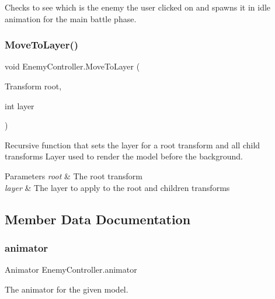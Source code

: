 Checks to see which is the enemy the user clicked on and spawns it in idle animation for the main battle phase. 

\mbox{\label{class_enemy_controller_a461addd95c41f6c754415cc6ef660856}} 
\subsubsection{\texorpdfstring{MoveToLayer()}{MoveToLayer()}}
{\footnotesize\ttfamily void Enemy\+Controller.\+Move\+To\+Layer (\begin{DoxyParamCaption}\item[{Transform}]{root,  }\item[{int}]{layer }\end{DoxyParamCaption})\hspace{0.3cm}{\ttfamily [private]}}



Recursive function that sets the layer for a root transform and all child transforms Layer used to render the model before the background. 


\begin{DoxyParams}{Parameters}
{\em root} & The root transform\\
\hline
{\em layer} & The layer to apply to the root and children transforms\\
\hline
\end{DoxyParams}


\subsection{Member Data Documentation}
\mbox{\label{class_enemy_controller_a8eba5438edc982ca7aa19493d0376412}} 
\subsubsection{\texorpdfstring{animator}{animator}}
{\footnotesize\ttfamily Animator Enemy\+Controller.\+animator\hspace{0.3cm}{\ttfamily [private]}}



The animator for the given model. 

